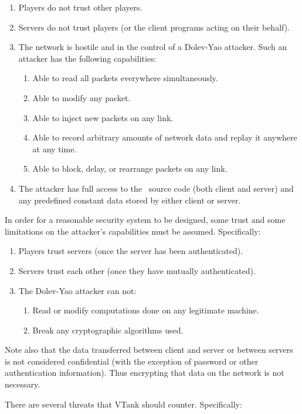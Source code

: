 \begin{enumerate}
\item Players do not trust other players.
\item Servers do not trust players (or the client programs acting on their behalf).
\item The network is hostile and in the control of a Dolev-Yao attacker. Such an attacker has the following capabilities:
  \begin{enumerate}
  \item Able to read all packets everywhere simultaneously.
  \item Able to modify any packet.
  \item Able to inject new packets on any link.
  \item Able to record arbitrary amounts of network data and replay it anywhere at any time.
  \item Able to block, delay, or rearrange packets on any link.
  \end{enumerate}
\item The attacker has full access to the \VTank\ source code (both client and server) and any predefined constant data stored by either client or server.
\end{enumerate}

In order for a reasonable security system to be designed, some trust and some limitations on the attacker's capabilities must be assumed. Specifically:

\begin{enumerate}
\item Players trust servers (once the server has been authenticated).
\item Servers trust each other (once they have mutually authenticated).
\item The Dolev-Yao attacker can not:
  \begin{enumerate}
  \item Read or modify computations done on any legitimate machine.
  \item Break any cryptographic algorithms used.
  \end{enumerate}
\end{enumerate}

Note also that the data transferred between client and server or between servers is not considered confidential (with the exception of password or other authentication information). Thus encrypting that data on the network is not necessary.

There are several threats that VTank should counter. Specifically:

